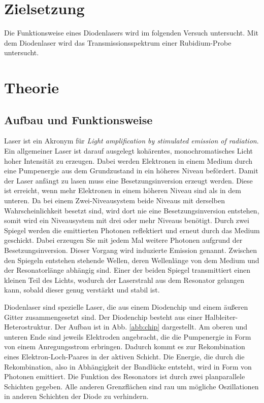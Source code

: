 \section{Zielsetzung}

Die Funktionsweise eines Diodenlasers wird im folgenden Versuch untersucht. Mit dem Diodenlaser wird das Transmissionsspektrum einer Rubidium-Probe untersucht. 

\section{Theorie}

\subsection{Aufbau und Funktionsweise}
Laser ist ein Akronym für \textit{Light amplification by stimulated emission of radiation}.
Ein allgemeiner Laser ist darauf ausgelegt kohärentes, monochromatisches Licht hoher Intensität zu erzeugen. Dabei werden Elektronen in einem Medium durch eine Pumpenergie aus dem Grundzustand in ein höheres Niveau befördert. Damit der Laser anfängt zu lasen muss eine Besetzungsinversion erzeugt werden. Diese ist erreicht, wenn mehr Elektronen in einem höheren Niveau sind als in dem unteren. Da bei einem Zwei-Niveausystem beide Niveaus mit derselben Wahrscheinlichkeit besetzt sind, wird dort nie eine Besetzungsinversion entstehen, somit wird ein Niveausystem mit drei oder mehr Niveaus benötigt. Durch zwei Spiegel werden die emittierten Photonen reflektiert und erneut durch das Medium geschickt. Dabei erzeugen Sie mit jedem Mal weitere Photonen aufgrund der Besetzungsinversion. Dieser Vorgang wird induzierte Emission genannt. Zwischen den Spiegeln entstehen stehende Wellen, deren Wellenlänge von dem Medium und der Resonatorlänge abhängig sind. 
Einer der beiden Spiegel transmittiert einen kleinen Teil des Lichts, wodurch der Laserstrahl aus dem Resonator gelangen kann, sobald dieser genug verstärkt und stabil ist. 

Diodenlaser sind spezielle Laser, die aus einem Diodenchip und einem äußeren Gitter zusammengesetzt sind. 
Der Diodenchip besteht aus einer Halbleiter-Heterostruktur. Der Aufbau ist in Abb. \ref{abb:chip} dargestellt. Am oberen und unteren Ende sind jeweils Elektroden angebracht, die die Pumpenergie in Form von einem Anregungsstrom erbringen. Dadurch kommt es zur Rekombination eines Elektron-Loch-Paares in der aktiven Schicht. Die Energie, die durch die Rekombination, also in Abhängigkeit der Bandlücke entsteht, wird in Form von Photonen emittiert. Die Funktion des Resonators ist durch zwei planparallele Schichten gegeben. Alle anderen Grenzflächen sind rau um mögliche Oszillationen in anderen Schichten der Diode zu verhindern.  

